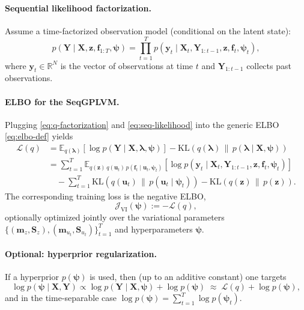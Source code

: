 \paragraph{Sequential likelihood factorization.}
Assume a time-factorized observation model (conditional on the latent state):
\begin{equation}
p(\mathbf{Y}\mid \mathbf{X},\mathbf{z},\mathbf{f}_{1:T},\boldsymbol{\psi})
=
\prod_{t=1}^{T}
p\!\left(\mathbf{y}_t \mid \mathbf{X}_t,\mathbf{Y}_{1:t-1},\mathbf{z},\mathbf{f}_t,\boldsymbol{\psi}_t\right),
\label{eq:seq-likelihood}
\end{equation}
where \(\mathbf{y}_t\in\mathbb{R}^{N}\) is the vector of observations at time \(t\) and \(\mathbf{Y}_{1:t-1}\) collects past observations.

\paragraph{ELBO for the SeqGPLVM.}
Plugging \eqref{eq:q-factorization} and \eqref{eq:seq-likelihood} into the generic ELBO \eqref{eq:elbo-def} yields
\begin{align}
\mathcal{L}(q)
&=
\mathbb{E}_{q(\boldsymbol{\lambda})}
\left[
\log p(\mathbf{Y}\mid \mathbf{X},\boldsymbol{\lambda},\boldsymbol{\psi})
\right]
-
\mathrm{KL}\!\left(q(\boldsymbol{\lambda})\,\|\,p(\boldsymbol{\lambda}\mid \mathbf{X},\boldsymbol{\psi})\right)
\nonumber\\
&=
\sum_{t=1}^{T}
\mathbb{E}_{q(\mathbf{z})\,q(\mathbf{u}_t)\,p(\mathbf{f}_t\mid \mathbf{u}_t,\boldsymbol{\psi}_t)}
\left[
\log p\!\left(\mathbf{y}_t \mid \mathbf{X}_t,\mathbf{Y}_{1:t-1},\mathbf{z},\mathbf{f}_t,\boldsymbol{\psi}_t\right)
\right]
\nonumber\\
&\quad
-\sum_{t=1}^{T}\mathrm{KL}\!\left(q(\mathbf{u}_t)\,\|\,p(\mathbf{u}_t\mid \boldsymbol{\psi}_t)\right)
-\mathrm{KL}\!\left(q(\mathbf{z})\,\|\,p(\mathbf{z})\right).
\label{eq:seqgplvm-elbo}
\end{align}
The corresponding training loss is the negative ELBO,
\begin{equation}
\mathcal{J}_{\text{VI}}(\boldsymbol{\psi})
:=
-\mathcal{L}(q),
\label{eq:neg-elbo-loss}
\end{equation}
optionally optimized jointly over the variational parameters \(\{(\mathbf{m}_z,\mathbf{S}_z),(\mathbf{m}_{u_t},\mathbf{S}_{u_t})\}_{t=1}^T\) and hyperparameters \(\boldsymbol{\psi}\).

\paragraph{Optional: hyperprior regularization.}
If a hyperprior \(p(\boldsymbol{\psi})\) is used, then (up to an additive constant) one targets
\begin{equation}
\log p(\boldsymbol{\psi}\mid \mathbf{X},\mathbf{Y})
\propto
\log p(\mathbf{Y}\mid \mathbf{X},\boldsymbol{\psi}) + \log p(\boldsymbol{\psi})
\;\approx\;
\mathcal{L}(q) + \log p(\boldsymbol{\psi}),
\label{eq:elbo-plus-hyperprior}
\end{equation}
and in the time-separable case \( \log p(\boldsymbol{\psi}) = \sum_{t=1}^{T}\log p(\boldsymbol{\psi}_t)\).

